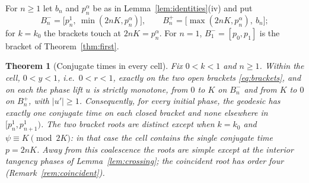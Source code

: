 \documentclass[11pt]{article}
\newtheorem{theorem}{Theorem}[section]
\theoremstyle{remark}
\begin{document}
For $n\ge1$ let $b_n$ and $p_n^\alpha$ be as in Lemma~\ref{lem:identities}(iv)
and put
\begin{equation}\label{eq:brackets}
 B_n^-=\bigl[p_n^1,\ \min(2nK,p_n^{\alpha})\bigr],\qquad
 B_n^+=\bigl[\max(2nK,p_n^{\alpha}),\ b_n\bigr];
\end{equation}
for $k=k_0$ the brackets touch at $2nK=p_n^\alpha$.  For $n=1$,
$B_1^-=[p_0,p_1]$ is the bracket of Theorem~\ref{thm:first}.

\begin{theorem}[Conjugate times in every cell]\label{thm:cells}
Fix $0<k<1$ and $n\ge1$.  Within the cell, $0<y<1$, i.e.\ $0<r<1$, exactly
on the two open brackets \eqref{eq:brackets}, and on each the phase lift $u$ is strictly monotone,
from $0$ to $K$ on $B_n^-$ and from $K$ to $0$ on $B_n^+$, with $|u'|\ge1$.
Consequently, for every initial phase, the geodesic has exactly one
conjugate time on each closed bracket and none elsewhere in
$[p_n^1,p_{n+1}^1)$.  The two bracket roots are distinct except when
$k=k_0$ and $\psi\equiv K\pmod{2K}$: in that case the cell contains the
single conjugate time $p=2nK$.  Away from this coalescence the roots are
simple except at the interior tangency phases of Lemma~\ref{lem:crossing};
the coincident root has order four (Remark~\ref{rem:coincident}).
\end{theorem}
\end{document}
